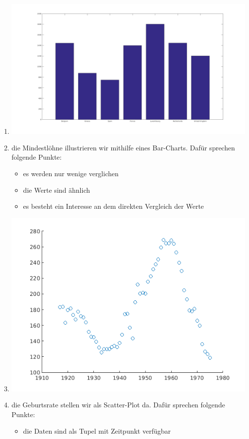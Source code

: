 \begin{enumerate}
	\item \includegraphics{Graphik/salary_bar}
	\item die Mindestlöhne illustrieren wir mithilfe eines Bar-Charts. Dafür sprechen folgende Punkte:
	\begin{itemize}
		\item es werden nur wenige verglichen
		\item die Werte sind ähnlich
		\item es besteht ein Interesse an dem direkten Vergleich der Werte
	\end{itemize}
	\item \includegraphics{Graphik/birthrates_scatter.png}
	\item die Geburtsrate stellen wir als Scatter-Plot da. Dafür sprechen folgende Punkte:
	\begin{itemize}
		\item die Daten sind als Tupel mit Zeitpunkt verfügbar

\end{itemize}
\end{enumerate}

